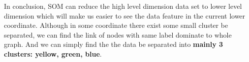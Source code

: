 \documentclass[titlepage,a4paper,12pt,thmsb]{report}
\begin{document}
\begin{center}
\begin{figure}[h]
{\par}
\end{figure}
{}
\end{center}

\begin{center}
\begin{figure}[h]
{\par}
\end{figure}
{}
\end{center}

In conclusion, SOM can reduce the high level dimension data set to lower level dimension which will make us easier to see the data feature in the current lower coordinate. Although in some coordinate there exist some small cluster be separated,  we can find the link of nodes with same label dominate to whole graph.  And we can simply find the the data be separated into {\bf mainly 3 clusters: yellow, green, blue}.
\end{document}
